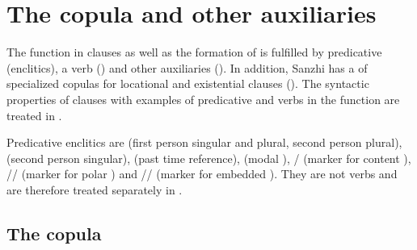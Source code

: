 \chapter{The copula and other auxiliaries}
\label{cpt:copulaotherauxiliaries}

The  function in  clauses as well as the formation of  is fulfilled by predicative  (enclitics), a  verb () and other auxiliaries (). In addition, Sanzhi has a  of specialized copulas for locational and existential clauses (). The syntactic properties of  clauses with examples of predicative  and verbs in the  function are treated in .

Predicative enclitics are  (first person singular and plural, second person plural),  (second person singular),  (past time reference),  (modal ), \slash{} (marker for content ), \slash{}\slash{} (marker for polar ) and \slash{}\slash{} (marker for embedded ). They are not verbs and are therefore treated separately in .



\section{The copula}
\label{sec:The copula}

